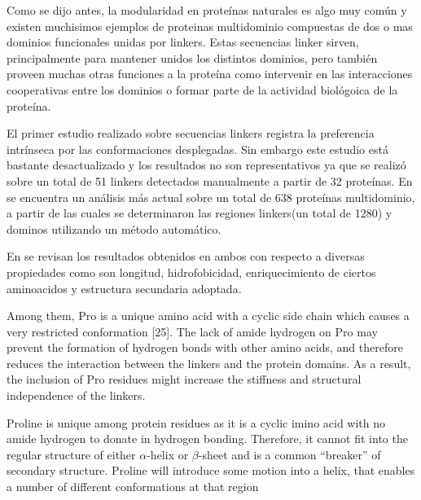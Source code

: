 Como se dijo antes, la modularidad en proteínas naturales es algo muy común y existen muchisimos ejemplos de proteinas multidominio compuestas de dos o mas dominios funcionales unidas por linkers.
Estas secuencias linker sirven, principalmente para mantener unidos los distintos dominios, pero también proveen muchas otras funciones a la proteína como intervenir en las interacciones cooperativas 
entre los dominios o formar parte de la actividad biológoica de la proteína.

El primer estudio realizado sobre secuencias linkers \cite{argos1990investigation} registra la preferencia intrínseca por las conformaciones desplegadas.   
Sin embargo este estudio está bastante desactualizado y los resultados no son representativos ya que se realizó sobre un total de 51 linkers detectados manualmente a partir de 32 proteínas.
En \cite{george2002analysis} se encuentra un análisis más actual sobre un total de 638 proteínas multidominio,  a partir de las cuales se determinaron las regiones linkers(un total de 1280) y dominos utilizando un método automático.


En \cite{chen2013fusion} se revisan los resultados obtenidos en ambos con respecto a diversas propiedades como son longitud, hidrofobicidad, enriquecimiento de ciertos aminoacidos y estructura secundaria adoptada.




Among them, Pro is a unique amino acid with a cyclic side chain which causes a very
restricted conformation [25]. The lack of amide hydrogen on Pro may prevent the formation
of hydrogen bonds with other amino acids, and therefore reduces the interaction between the
linkers and the protein domains.
As a result, the inclusion of Pro residues might increase the
stiffness and structural independence of the linkers.

Proline is unique among protein residues as
it is a cyclic imino acid with no amide hydrogen to donate in
hydrogen bonding. Therefore, it cannot fit into the regular
structure of either $\alpha$-helix or $\beta$-sheet and is a common ``breaker''
of secondary structure.
Proline will introduce some motion into a
helix, that enables a number of different conformations at that
region

